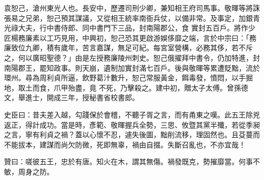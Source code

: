 \begin{pinyinscope}
 袁恕己，滄州東光人也。長安中，歷遷司刑少卿，兼知相王府司馬事。敬暉等將誅張易之兄弟，恕己預其謀議，又從相王統率南衙兵仗，以備非常。及事定，加銀青光祿大夫，行中書侍郎、同中書門下三品，封南陽郡公，食
 實封五百戶。將作少匠楊務廉素以工巧見用，中興初，恕己恐其更啟游娛侈靡之端，言於中宗曰：「務廉致位九卿，積有歲年，苦言嘉謀，無足可紀。每宮室營構，必務其侈，若不斥之，何以廣昭聖德？」由是左授務廉陵州刺史。恕己俄擢拜中書令，仍加特進，封南陽郡王，罷知政事。則天崩，遺制加實封滿七百戶。後與敬暉等累遭貶黜，流於環州。尋為周利貞所逼，飲野葛汁數升，恕己常服黃金，餌毒發，憤悶，以手掘地，取土而食，爪甲殆盡，竟
 不死，乃擊殺之。建中初，贈太子太傅。曾孫德文，舉進士，開成三年，授秘書省校書郎。



 史臣曰：昔夫差入越，勾踐保於會稽，不聽子胥之言，而有甬東之嘆。此五王除兇返正，得計成功。當是時，彥範、敬暉握兵全勢，三思、攸暨其黨半殲，若從季昶之言，寧有利貞之禍？蓋以心懷不忍，遽失後圖，黜削流移，理固然也。且芟蔓而不能拔本，建謀而尚欠防微，死即無辜，禍由自掇。失斷召亂也，不亦宜哉！



 贊曰：嗟彼五王，忠於有唐。知火在木，謂其無傷。禍發既克，勢摧靡當。何事不敏，周身之防。



\end{pinyinscope}